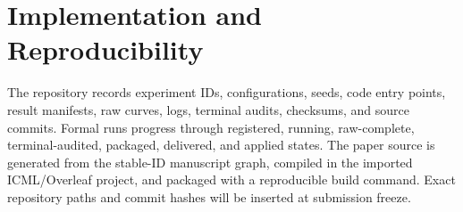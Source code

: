 \section{Implementation and Reproducibility}
\label{app:repro}

The repository records experiment IDs, configurations, seeds, code entry points, result manifests, raw curves, logs, terminal audits, checksums, and source commits. Formal runs progress through registered, running, raw-complete, terminal-audited, packaged, delivered, and applied states. The paper source is generated from the stable-ID manuscript graph, compiled in the imported ICML/Overleaf project, and packaged with a reproducible build command. Exact repository paths and commit hashes will be inserted at submission freeze.
